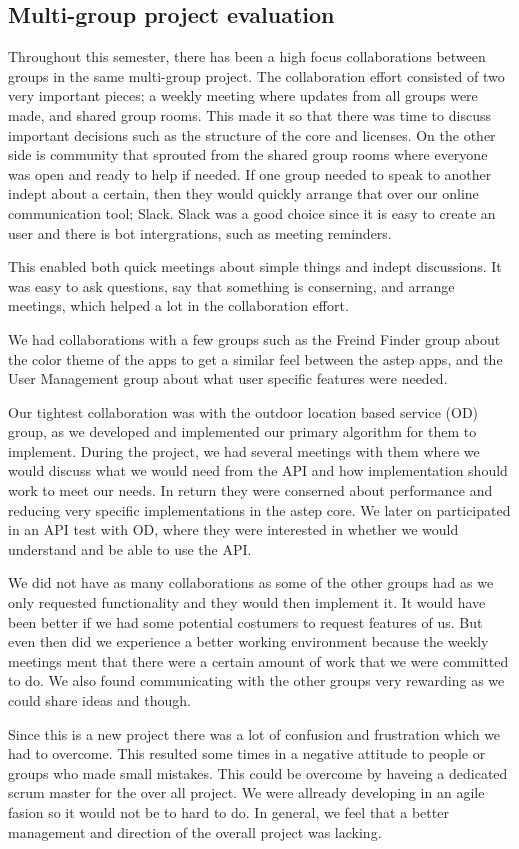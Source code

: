 \subsection{Multi-group project evaluation}
Throughout this semester, there has been a high focus collaborations between groups in the same multi-group project.
The collaboration effort consisted of two very important pieces; a weekly meeting where updates from all groups were made, and shared group rooms.
This made it so that there was time to discuss important decisions such as the structure of the core and licenses.
On the other side is community that sprouted from the shared group rooms where everyone was open and ready to help if needed.
If one group needed to speak to another indept about a certain, then they would quickly arrange that over our online communication tool; Slack.
Slack was a good choice since it is easy to create an user and there is bot intergrations, such as meeting reminders.

This enabled both quick meetings about simple things and indept discussions.
It was easy to ask questions, say that something is conserning, and arrange meetings, which helped a lot in the collaboration effort.

We had collaborations with a few groups such as the Freind Finder group about the color theme of the apps to get a similar feel between the \gls{astep} apps, and the User Management group about what user specific features were needed.

Our tightest collaboration was with the outdoor location based service (OD) group, as we developed and implemented our primary algorithm for them to implement.
During the project, we had several meetings with them where we would discuss what we would need from the API and how implementation should work to meet our needs.
In return they were conserned about performance and reducing very specific implementations in the \gls{astep} core.
We later on participated in an API test with OD, where they were interested in whether we would understand and be able to use the API.

We did not have as many collaborations as some of the other groups had as we only requested functionality and they would then implement it.
It would have been better if we had some potential costumers to request features of us.
But even then did we experience a better working environment because the weekly meetings ment that there were a certain amount of work that we were committed to do.
We also found communicating with the other groups very rewarding as we could share ideas and though.

Since this is a new project there was a lot of confusion and frustration which we had to overcome.
This resulted some times in a negative attitude to people or groups who made small mistakes.
This could be overcome by haveing a dedicated scrum master for the over all project.
We were allready developing in an agile fasion so it would not be to hard to do.
In general, we feel that a better management and direction of the overall project was lacking.
